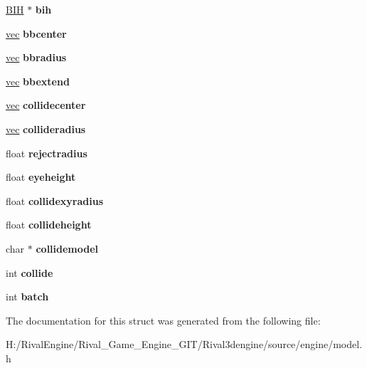 \begin{DoxyCompactItemize}
\item 
\mbox{\label{structmodel_a2d78059e03077ecd7a320f8d31cc4bdc}} 
\hyperlink{struct_b_i_h}{B\+IH} $\ast$ {\bfseries bih}
\item 
\mbox{\label{structmodel_ab0bae27088fc6684dd3ee4cd928d4763}} 
\hyperlink{structvec}{vec} {\bfseries bbcenter}
\item 
\mbox{\label{structmodel_aa6917f64b7ef84a1fde04d3da1560a75}} 
\hyperlink{structvec}{vec} {\bfseries bbradius}
\item 
\mbox{\label{structmodel_a4d3dc5274e4fd15526e71cf8c361aa80}} 
\hyperlink{structvec}{vec} {\bfseries bbextend}
\item 
\mbox{\label{structmodel_a2e02a47a8ea671ea191a7bd1fbe2acc8}} 
\hyperlink{structvec}{vec} {\bfseries collidecenter}
\item 
\mbox{\label{structmodel_a8dffe5ed3634fdd3a1e5d448390e41d7}} 
\hyperlink{structvec}{vec} {\bfseries collideradius}
\item 
\mbox{\label{structmodel_aeaa3a487fadedda117b9865452feb1bb}} 
float {\bfseries rejectradius}
\item 
\mbox{\label{structmodel_a191b294c19531d85f80e208eb5704e64}} 
float {\bfseries eyeheight}
\item 
\mbox{\label{structmodel_aebd34301bd70916ad32ad96c34110eee}} 
float {\bfseries collidexyradius}
\item 
\mbox{\label{structmodel_aa43a7a6e0c8b8671612730319c97a1f0}} 
float {\bfseries collideheight}
\item 
\mbox{\label{structmodel_af3e4b40f4189980ba6ae307cc2e8ba0f}} 
char $\ast$ {\bfseries collidemodel}
\item 
\mbox{\label{structmodel_a41f8266c19b7cb8148223f77bf3de484}} 
int {\bfseries collide}
\item 
\mbox{\label{structmodel_abe09fa8a06323d129d78661318f43ff3}} 
int {\bfseries batch}
\end{DoxyCompactItemize}


The documentation for this struct was generated from the following file\+:\begin{DoxyCompactItemize}
\item 
H\+:/\+Rival\+Engine/\+Rival\+\_\+\+Game\+\_\+\+Engine\+\_\+\+G\+I\+T/\+Rival3dengine/source/engine/model.\+h\end{DoxyCompactItemize}
